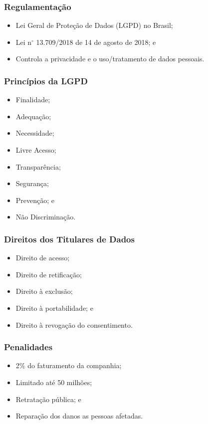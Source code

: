 \documentclass[aspectratio=169]{beamer} %
\begin{document}
\begin{frame}
	\frametitle{Regulamentação}
	
	\begin{itemize}
		\item Lei Geral de Proteção de Dados (LGPD) no Brasil;
		\item Lei n$^{\circ}$ 13.709/2018 de 14 de agosto de 2018; e
		\item Controla a privacidade e o uso/tratamento de dados pessoais.
	\end{itemize}
\end{frame}

\begin{frame}
	\frametitle{Princípios da LGPD}
	
	\begin{itemize}
		\item Finalidade;
		\item Adequação;
		\item Necessidade;
		\item Livre Acesso;
		\item Transparência;
		\item Segurança;
		\item Prevenção; e
		\item Não Discriminação.
	\end{itemize}
\end{frame}

\begin{frame}
	\frametitle{Direitos dos Titulares de Dados}
	
	\begin{itemize}
		\item Direito de acesso;
		\item Direito de retificação;
		\item Direito à exclusão;
		\item Direito à portabilidade; e
		\item Direito à revogação do consentimento.
	\end{itemize}
\end{frame}

\begin{frame}
	\frametitle{Penalidades}
	
	\begin{itemize}
		\item 2$\%$ do faturamento da companhia;
		\item Limitado até 50 milhões;
		\item Retratação pública; e
		\item Reparação dos danos as pessoas afetadas.
	\end{itemize}
\end{frame}
\end{document}
